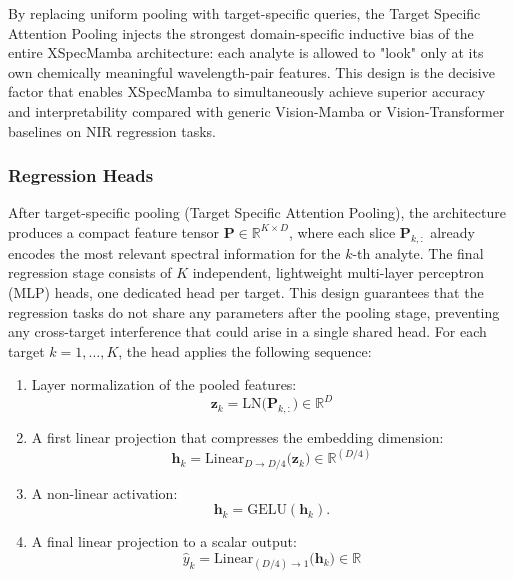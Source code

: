 \documentclass[pdflatex,sn-mathphys-num]{sn-jnl}%
\begin{document}
By replacing uniform pooling with target-specific queries, the Target Specific Attention Pooling injects the strongest domain-specific inductive bias of the entire XSpecMamba architecture: each analyte is allowed to "look" only at its own chemically meaningful wavelength-pair features. This design is the decisive factor that enables XSpecMamba to simultaneously achieve superior accuracy and interpretability compared with generic Vision-Mamba or Vision-Transformer baselines on NIR regression tasks.

\subsubsection{Regression Heads}\label{sec:regression-heads}
After target-specific pooling (Target Specific Attention Pooling), the architecture produces a compact feature tensor $\mathbf{P} \in \mathbb{R}^{K \times D}$, where each slice $\mathbf{P}_{k,:}$ already encodes the most relevant spectral information for the $k$-th analyte. The final regression stage consists of $K$ independent, lightweight multi-layer perceptron (MLP) heads, one dedicated head per target. This design guarantees that the regression tasks do not share any parameters after the pooling stage, preventing any cross-target interference that could arise in a single shared head.
For each target $k = 1, \dots, K$, the head applies the following sequence:
\begin{enumerate}
    \item Layer normalization of the pooled features:
    \begin{equation}
        \mathbf{z}_k = \text{LN}\bigl(\mathbf{P}_{k,:}\bigr) \in \mathbb{R}^{D}
    \end{equation}
    \item A first linear projection that compresses the embedding dimension:
    \begin{equation}
        \mathbf{h}_k = \text{Linear}_{D \to D/4}\bigl(\mathbf{z}_k\bigr) \in \mathbb{R}^{(D/4)}
    \end{equation}
    \item A non-linear activation:
    \begin{equation}
        \mathbf{h}_k = \text{GELU}(\mathbf{h}_k).
    \end{equation}
    \item A final linear projection to a scalar output:
    \begin{equation}
        \hat{y}_{k} = \text{Linear}_{(D/4) \to 1}\bigl(\mathbf{h}_k\bigr) \in \mathbb{R}
    \end{equation}
\end{enumerate}
\end{document}
